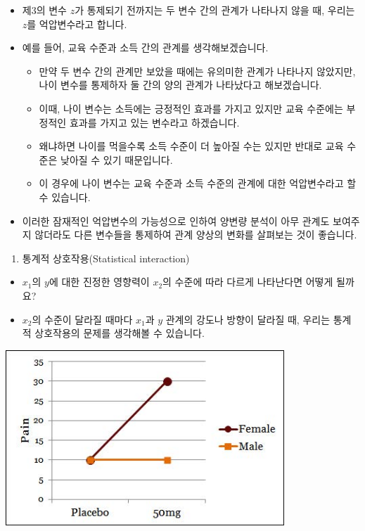 \documentclass[]{book}
\providecommand{\tightlist}{%
  \setlength{\itemsep}{0pt}\setlength{\parskip}{0pt}}
\begin{document}
\begin{itemize}
  \begin{itemize}
  \tightlist
  \item
    제3의 변수 \(z\)가 통제되기 전까지는 두 변수 간의 관계가 나타나지 않을 때, 우리는 \(z\)를 억압변수라고 합니다.
  \item
    예를 들어, 교육 수준과 소득 간의 관계를 생각해보겠습니다.

    \begin{itemize}
    \tightlist
    \item
      만약 두 변수 간의 관계만 보았을 때에는 유의미한 관계가 나타나지 않았지만, 나이 변수를 통제하자 둘 간의 양의 관계가 나타났다고 해보겠습니다.
    \item
      이때, 나이 변수는 소득에는 긍정적인 효과를 가지고 있지만 교육 수준에는 부정적인 효과를 가지고 있는 변수라고 하겠습니다.
    \item
      왜냐하면 나이를 먹을수록 소득 수준이 더 높아질 수는 있지만 반대로 교육 수준은 낮아질 수 있기 때문입니다.
    \item
      이 경우에 나이 변수는 교육 수준과 소득 수준의 관계에 대한 억압변수라고 할 수 있습니다.
    \end{itemize}
  \item
    이러한 잠재적인 억압변수의 가능성으로 인하여 양변량 분석이 아무 관계도 보여주지 않더라도 다른 변수들을 통제하여 관계 양상의 변화를 살펴보는 것이 좋습니다.
  \end{itemize}

  \begin{enumerate}
  \def\labelenumi{\arabic{enumi}.}
  \setcounter{enumi}{4}
  \tightlist
  \item
    통계적 상호작용(Statistical interaction)
  \end{enumerate}

  \begin{itemize}
  \tightlist
  \item
    \(x_1\)의 \(y\)에 대한 진정한 영향력이 \(x_2\)의 수준에 따라 다르게 나타난다면 어떻게 될까요?
  \item
    \(x_2\)의 수준이 달라질 때마다 \(x_1\)과 \(y\) 관계의 강도나 방향이 달라질 때, 우리는 통계적 상호작용의 문제를 생각해볼 수 있습니다.
  \end{itemize}
\end{itemize}

\begin{center}\includegraphics[width=4.12in]{./Chapters_pdfR/plot/interaction} \end{center}
\end{document}
